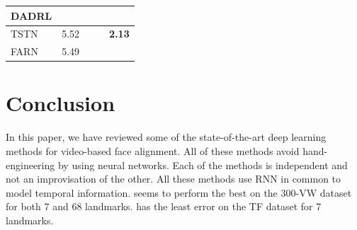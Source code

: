 \documentclass{llncs}
\begin{document}
\begin{table}[]
\begin{tabular}{|l|l|l|l|l|}
DADRL\cite{dadrl}                   &                                                                        &                                                                       &                                                                        &                                                                       \\ \hline
TSTN\cite{tstn}                    & 5.52                                                                   &                                                                       &                                                                        & \textbf{2.13}                                                         \\ \hline
FARN\cite{farn}                    & 5.49                                                                   &                                                                       &                                                                        &                                                                       \\ \hline
\end{tabular}
\label{comparison}
\end{table}



\section{Conclusion}

In this paper, we have reviewed some of the state-of-the-art deep learning methods for video-based face alignment. All of these methods avoid hand-engineering by using neural networks. Each of the methods is independent and not an improvisation of the other. All these methods use RNN in common to model temporal information. \cite{rednet} seems to perform the best on the 300-VW dataset for both 7 and 68 landmarks. \cite{tstn} has the least error on the TF dataset for 7 landmarks. 

%

%
%


%
\end{document}
